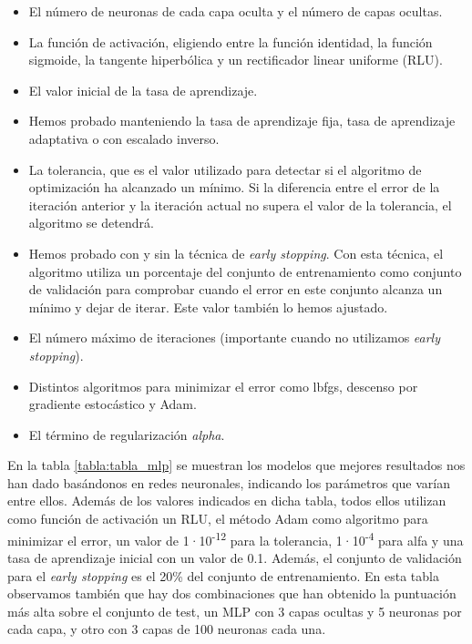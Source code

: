 \documentclass[journal,twoside]{JoPhA}
\begin{document}
\begin{itemize}
	\item El número de neuronas de cada capa oculta y el número de capas ocultas.  \\
	\item La función de activación, eligiendo entre la función identidad, la función sigmoide, la tangente hiperbólica y un rectificador linear uniforme (RLU). \\
	\item El valor inicial de la tasa de aprendizaje.  \\
	\item Hemos probado manteniendo la tasa de aprendizaje fija, tasa de aprendizaje adaptativa o con escalado inverso.  \\
	\item La tolerancia, que es el valor utilizado para detectar si el algoritmo de optimización ha alcanzado un mínimo. Si la diferencia entre el error de la iteración anterior y la iteración actual no supera el valor de la tolerancia, el algoritmo se detendrá.  \\
	\item Hemos probado con y sin la técnica de \textit{early stopping}. Con esta técnica, el algoritmo utiliza un porcentaje del conjunto de entrenamiento como conjunto de validación para comprobar cuando el error en este conjunto alcanza un mínimo y dejar de iterar. Este valor también lo hemos ajustado.   \\
	\item El número máximo de iteraciones (importante cuando no utilizamos \textit{early stopping}).  \\
	\item Distintos algoritmos para minimizar el error como lbfgs, descenso por gradiente estocástico y Adam.  \\
	\item El término de regularización \textit{alpha}.  \\
\end{itemize}

En la tabla \ref{tabla:tabla_mlp} se muestran los modelos que mejores resultados nos han dado basándonos en redes neuronales, indicando los parámetros que varían entre ellos. Además de los valores indicados en dicha tabla, todos ellos utilizan como función de activación un RLU, el método Adam como algoritmo para minimizar el error, un valor de 1·10\textsuperscript{-12} para la tolerancia, 1·10\textsuperscript{-4} para alfa y una tasa de aprendizaje inicial con un valor de 0.1. Además, el conjunto de validación para el \textit{early stopping} es el 20\% del conjunto de entrenamiento. En esta tabla observamos también que hay dos combinaciones que han obtenido la puntuación más alta sobre el conjunto de test, un MLP con 3 capas ocultas y 5 neuronas por cada capa, y otro con 3 capas de 100 neuronas cada una.
\end{document}

